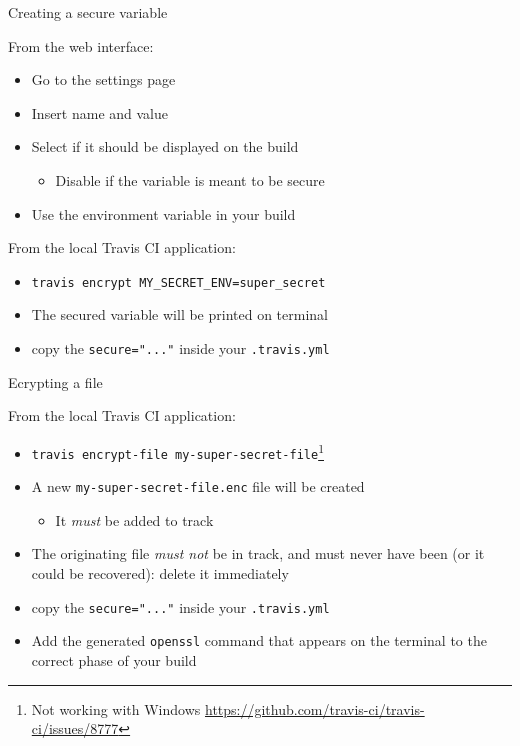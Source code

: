 \documentclass[presentation]{beamer}
\begin{document}
\begin{frame}{Creating a secure variable}
    \begin{block}{From the web interface:}
        \begin{itemize}
            \item Go to the settings page
            \item Insert name and value
            \item Select if it should be displayed on the build
            \begin{itemize}
                \item Disable if the variable is meant to be secure
            \end{itemize}
            \item Use the environment variable in your build
        \end{itemize}
    \end{block}
    \begin{block}{From the local Travis CI application:}
        \begin{itemize}
            \item \texttt{travis encrypt MY\_SECRET\_ENV=super\_secret}
            \item The secured variable will be printed on terminal
            \item copy the \texttt{secure="..."} inside your \texttt{.travis.yml}
        \end{itemize}
    \end{block}
\end{frame}

\begin{frame}{Ecrypting a file}
    \begin{block}{From the local Travis CI application:}
        \begin{itemize}
            \item \texttt{travis encrypt-file my-super-secret-file}\footnote{Not working with Windows \url{https://github.com/travis-ci/travis-ci/issues/8777}}
            \item A new \texttt{my-super-secret-file.enc} file will be created
            \begin{itemize}
                \item It \textit{must} be added to track
            \end{itemize}
            \item The originating file \textit{must not} be in track, and must never have been (or it could be recovered): delete it immediately
            \item copy the \texttt{secure="..."} inside your \texttt{.travis.yml}
            \item Add the generated \texttt{openssl} command that appears on the terminal to the correct phase of your build
        \end{itemize}
    \end{block}
\end{frame}
\end{document}
